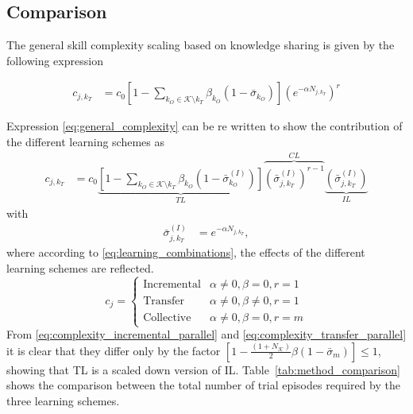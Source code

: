 \subsection{Comparison}
The general skill complexity scaling based on knowledge sharing is given by the following expression
\begin{tcolorbox}
\begin{align}\label{eq:general_complexity}
	c_{j,k_T} &= c_0\left[1- \sum\limits_{k_O \in \mathcal{K} \setminus k_T}\beta_{k_O} \left( 1 - \bar{\sigma}_{k_O} \right)\right] \left(e^{-\alpha N_{j,k_T}} \right)^r
\end{align}
\end{tcolorbox}
Expression \ref{eq:general_complexity} can be re written to show the contribution of the different learning schemes as
\begin{align}
c_{j,k_T} &= c_0\underbrace{\left[1- \sum\limits_{k_O \in \mathcal{K} \setminus k_T}\beta_{k_O} \left( 1 - \bar{\sigma}^{(I)}_{k_O} \right)\right]}_{TL}\overbrace{ \left(\bar{\sigma}^{(I)}_{j,k_T} \right)^{r-1}}^{CL}\underbrace{ \left(\bar{\sigma}^{(I)}_{j,k_T} \right)}_{IL}
\end{align}
with
\begin{align}
\bar{\sigma}^{(I)}_{j,k_T}&= e^{-\alpha N_{j,k_T}},
\end{align}
where according to \eqref{eq:learning_combinations}, the effects of the different learning schemes are reflected.
\begin{equation}
c_j =
\begin{cases} 
	\text{Incremental} & \alpha\neq 0, \beta=0,  r=1 \\
	\text{Transfer} & \alpha\neq 0, \beta \neq 0, r = 1 \\
	\text{Collective} & \alpha\neq 0, \beta = 0, r=m 
\end{cases}
\label{eq:learning_combinations}
\end{equation}
From \eqref{eq:complexity_incremental_parallel} and \eqref{eq:complexity_transfer_parallel} it is clear that they differ only by the factor $ \left[1 - \frac{\left(1+N_\mathcal{K}\right)}{2}\beta \left(1-\bar{\sigma}_m\right)\right] \leq 1$, showing that TL is a scaled down version of IL. Table~\ref{tab:method_comparison} shows the comparison between the total number of trial episodes required by the three learning schemes.

